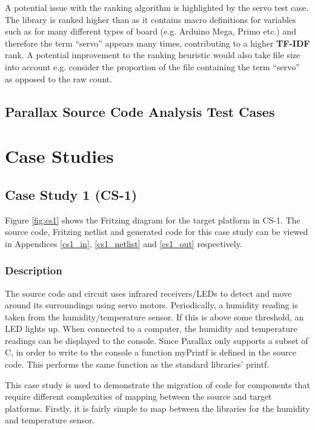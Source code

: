 \documentclass{UoYCSproject}
\begin{document}
A potential issue with the ranking algorithm is highlighted by the servo test case. The  library is ranked higher than  as it contains macro definitions for variables such as  for many different types of board (e.g. Arduino Mega, Primo etc.) and therefore the term ``servo'' appears many times, contributing to a higher \textbf{TF-IDF} rank. A potential improvement to the ranking heuristic would also take file size into account e.g. consider the proportion of the file containing the term ``servo'' as opposed to the raw count.

\subsection{Parallax Source Code Analysis Test Cases}

\section{Case Studies} \label{eval_case_studies}
\subsection{Case Study 1 (CS-1)} \label{cs1}


Figure \ref{fig:cs1} shows the Fritzing diagram for the target platform in CS-1. The source code, Fritzing netlist and generated code for this case study can be viewed in Appendices \ref{cs1_in}, \ref{cs1_netlist} and \ref{cs1_out} respectively.

\subsubsection{Description}
The source code and circuit uses infrared receivers/LEDs to detect and move around its surroundings using servo motors. Periodically, a humidity reading is taken from the humidity/temperature sensor. If this is above some threshold, an LED lights up. When connected to a computer, the humidity and temperature readings can be displayed to the console. Since Parallax only supports a subset of C, in order to write to the console a function myPrintf is defined in the source code. This performs the same function as the standard libraries' printf.

This case study is used to demonstrate the migration of code for components that require different complexities of mapping between the source and target platforms. Firstly, it is fairly simple to map between the libraries for the humidity and temperature sensor. 
\end{document}
